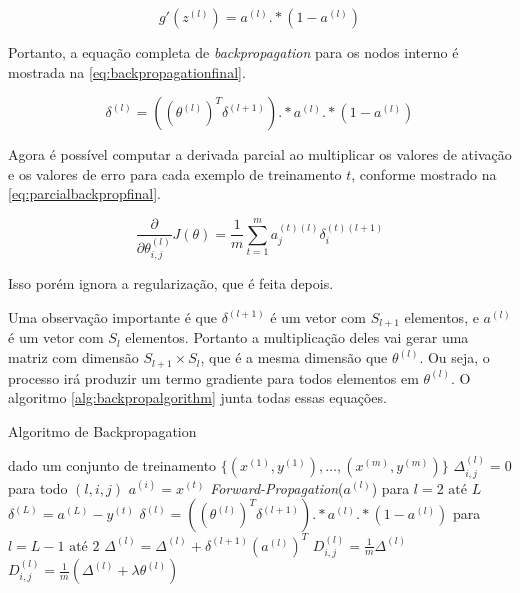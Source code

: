 \begin{equation}\label{eq:funcaogprime}
g'(z^{(l)}) = a^{(l)} .* (1 - a^{(l)}) 
\end{equation}

Portanto, a equação completa de \textit{backpropagation} para os nodos interno é mostrada na \autoref{eq:backpropagationfinal}.

\begin{equation}\label{eq:backpropagationfinal}
\delta^{(l)} = ((\theta^{(l)})^T \delta^{(l+1)}) .* a^{(l)} .* (1 - a^{(l)}) 
\end{equation}

Agora é possível computar a derivada parcial ao multiplicar os valores de ativação e os valores de erro para cada exemplo de treinamento $t$, conforme mostrado na \autoref{eq:parcialbackpropfinal}.

\begin{equation}\label{eq:parcialbackpropfinal}
\frac{\partial}{\partial\theta_{i,j}^{(l)}} J(\theta) = \frac{1}{m} \sum\limits_{t=1}^{m} a_j^{(t)(l)} \delta_i^{(t)(l+1)}
\end{equation}

Isso porém ignora a regularização, que é feita depois.

Uma observação importante é que $\delta^{(l+1)}$ é um vetor com $S_{l+1}$ elementos, e $a^{(l)}$ é um vetor com $S_l$ elementos. Portanto a multiplicação deles vai gerar uma matriz com dimensão $S_{l+1} \times S_l$, que é a mesma dimensão que $\theta^{(l)}$. Ou seja, o processo irá produzir um termo gradiente para todos elementos em $\theta^{(l)}$. O algoritmo \autoref{alg:backpropalgorithm} junta todas essas equações.

\begin{algorithm}
\caption{Algoritmo de Backpropagation} \label{alg:backpropalgorithm}
\begin{algorithmic}
	\State dado um conjunto de treinamento $\{(x^{(1)}, y^{(1)}), \ldots, (x^{(m)}, y^{(m)}) \}$
	\State $\Delta_{i,j}^{(l)} = 0$ para todo $(l, i, j)$
		\State $a^{(i)} = x^{(t)}$
		\State \textit{Forward-Propagation}($a^{(l)}$) para $l = 2 \text{ até } L$
		\State $\delta^{(L)} = a^{(L)} - y^{(t)}$
		\State $\delta^{(l)} = ((\theta^{(l)})^T \delta^{(l+1)}) .* a^{(l)} .* (1 - a^{(l)})$ para $l = L-1 \text{ até } 2$
		\State $\Delta^{(l)} = \Delta^{(l)} + \delta^{(l+1)}(a^{(l)})^T $ 
	\EndFor
			\State $D_{i,j}^{(l)} = \frac{1}{m}\Delta^{(l)}$
		\Else
			\State $D_{i,j}^{(l)} = \frac{1}{m}(\Delta^{(l)} + \lambda\theta^{(l)})$
		\EndIf
\EndProcedure
\end{algorithmic}
\end{algorithm}

